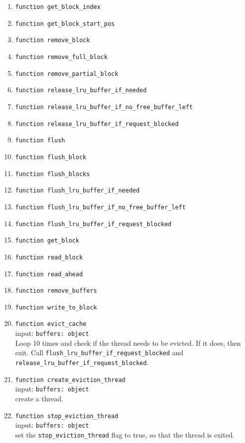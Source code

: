 \begin{enumerate}
    \item \verb|function get_block_index| 
    \item \verb|function get_block_start_pos| 
    \item \verb|function remove_block| 
    \item \verb|function remove_full_block| 
    \item \verb|function remove_partial_block| 
    \item \verb|function release_lru_buffer_if_needed| 
    \item \verb|function release_lru_buffer_if_no_free_buffer_left| 
    \item \verb|function release_lru_buffer_if_request_blocked| 
    \item \verb|function flush| 
    \item \verb|function flush_block| 
    \item \verb|function flush_blocks| 
    \item \verb|function flush_lru_buffer_if_needed| 
    \item \verb|function flush_lru_buffer_if_no_free_buffer_left| 
    \item \verb|function flush_lru_buffer_if_request_blocked| 
    \item \verb|function get_block| 
    \item \verb|function read_block| 
    \item \verb|function read_ahead| 
    \item \verb|function remove_buffers| 
    \item \verb|function write_to_block| 
    \item \verb|function evict_cache| \\
    input: \verb|buffers: object| \\
    Loop 10 times and check if the thread needs to be evicted. If it does, then exit.
    Call \verb|flush_lru_buffer_if_request_blocked| and \\ \verb|release_lru_buffer_if_request_blocked|.
    \item \verb|function create_eviction_thread| \\
    input: \verb|buffers: object| \\
    create a thread.
    \item \verb|function stop_eviction_thread| \\
    input: \verb|buffers: object| \\
    set the \verb|stop_eviction_thread| flag to true, so that the thread is exited.
\end{enumerate}
